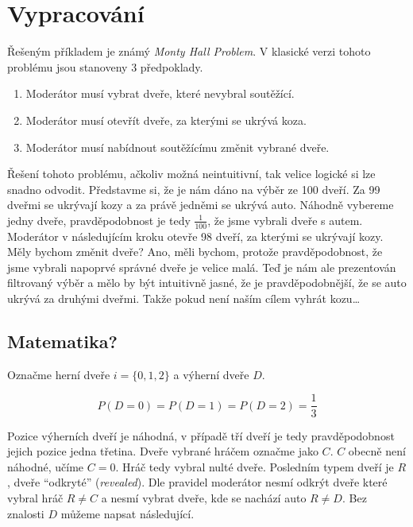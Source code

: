 \section{Vypracování}

Řešeným příkladem je známý \textit{Monty Hall Problem}.
V klasické verzi tohoto problému jsou stanoveny 3 předpoklady.

\begin{enumerate}
    \item Moderátor musí vybrat dveře, které nevybral soutěžící.
    \item Moderátor musí otevřít dveře, za kterými se ukrývá koza.
    \item Moderátor musí nabídnout soutěžícímu změnit vybrané dveře.
\end{enumerate}

Řešení tohoto problému, ačkoliv možná neintuitivní, tak velice logické si lze snadno odvodit.
Představme si, že je nám dáno na výběr ze 100 dveří.
Za 99 dveřmi se ukrývají kozy a za právě jedněmi se ukrývá auto.
Náhodně vybereme jedny dveře, pravděpodobnost je tedy \( \frac{1}{100} \), že jsme vybrali dveře s autem.
Moderátor v následujícím kroku otevře 98 dveří, za kterými se ukrývají kozy.
Měly bychom změnit dveře?
Ano, měli bychom, protože pravděpodobnost, že jsme vybrali napoprvé správné dveře je velice malá.
Teď je nám ale prezentován filtrovaný výběr a mělo by být intuitivně jasné, že je pravděpodobnější, že se auto ukrývá za druhými dveřmi.
Takže pokud není naším cílem vyhrát kozu\ldots

\subsection{Matematika?}

Označme herní dveře \( i = \{0, 1, 2\}\) a výherní dveře \( D \).

\begin{equation}
    P(D = 0) = P(D = 1) = P(D = 2) = \frac{1}{3}
\end{equation}

Pozice výherních dveří je náhodná, v případě tří dveří je tedy pravděpodobnost jejich pozice jedna třetina.
Dveře vybrané hráčem označme jako \( C \).
\( C \) obecně není náhodné, učíme \( C = 0 \).
Hráč tedy vybral nulté dveře.
Posledním typem dveří je \( R \), dveře \enquote{odkryté} (\textit{revealed}).
Dle pravidel moderátor nesmí odkrýt dveře které vybral hráč \( R \neq C \) a nesmí vybrat dveře, kde se nachází auto \( R \neq D \).
Bez znalosti \( D \) můžeme napsat následující.

